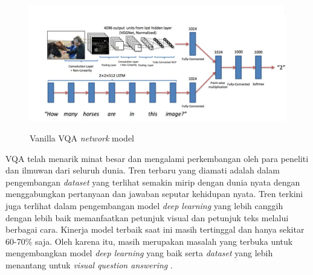 \begin{figure}[H]
    \centering
    {\includegraphics [width=\textwidth]{image/bab2/vqa.jpeg}}
    \caption{Vanilla VQA \textit{network} model \citep{srivastava2021visual}}
    \label{exp: visual question answering}
\end{figure}



\par VQA telah menarik minat besar dan mengalami perkembangan oleh para peneliti dan ilmuwan dari seluruh dunia. Tren terbaru yang diamati adalah dalam pengembangan \textit{dataset} yang terlihat semakin mirip dengan dunia nyata dengan menggabungkan pertanyaan dan jawaban seputar kehidupan nyata. Tren terkini juga terlihat dalam pengembangan model \textit{deep learning} yang lebih canggih dengan lebih baik memanfaatkan petunjuk visual dan petunjuk teks melalui berbagai cara. Kinerja model terbaik saat ini masih tertinggal dan hanya sekitar 60-70\% saja. Oleh karena itu, masih merupakan masalah yang terbuka untuk mengembangkan model \textit{deep learning} yang baik serta \textit{dataset} yang lebih menantang untuk \textit{visual question answering} \citep{srivastava2021visual}. 

